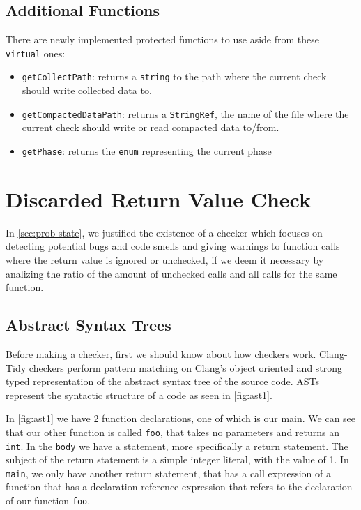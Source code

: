 \subsection{Additional Functions}

There are newly implemented protected functions to use aside from these \lstinline{virtual} ones:
\begin{itemize}
	\item \texttt{getCollectPath}: returns a \lstinline{string} to the path where the current check should write collected data to.
	\item \texttt{getCompactedDataPath}: returns a \lstinline{StringRef}, the name of the file where the current check should write or read compacted data to/from.
	\item \texttt{getPhase}: returns the \texttt{enum} representing the current phase
\end{itemize}

\section{Discarded Return Value Check} %
\label{sec:dev-checker}

In \cref{sec:prob-state}, we justified the existence of a checker which focuses on detecting potential bugs and code smells
and giving warnings to function calls where the return value is ignored or unchecked, if we deem it necessary by analizing the ratio
of the amount of unchecked calls and all calls for the same function.

\subsection{Abstract Syntax Trees}

Before making a checker, first we should know about how checkers work. Clang-Tidy checkers perform pattern matching on
Clang's object oriented and strong typed representation of the abstract syntax tree of the source code.
ASTs represent the syntactic structure of a code as seen in \cref{fig:ast1}.

In \cref{fig:ast1} we have 2 function declarations, one of which is our main. We can see that our other function is called \texttt{foo},
that takes no parameters and returns an \lstinline{int}. In the \texttt{body} we have a statement, more specifically a
return statement. The subject of the return statement is a simple integer literal, with the value of 1.
In \texttt{main}, we only have another return statement, that has a call expression of a function that has a
declaration reference expression that refers to the declaration of our function \texttt{foo}.

